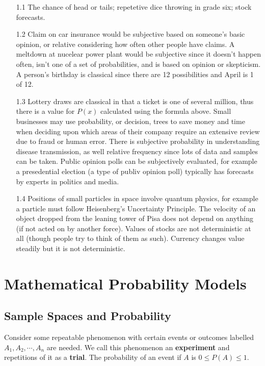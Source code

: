 \documentclass[english, 11pt]{article}
\begin{document}
  \begin{itemize}
    \item[1.1] The chance of head or tails; repetetive dice throwing in grade six; stock forecasts.
    \item[1.2] Claim on car insurance would be subjective based on someone's basic opinion, or relative considering how often other people have claims. A meltdown at nucelear power plant would be subjective since it doesn't happen often, isn't one of a set of probabilities, and is based on opinion or skepticism. A person's birthday is classical since there are 12 possibilities and April is 1 of 12.
    \item[1.3] Lottery draws are classical in that a ticket is one of several million, thus there is a value for $P(x)$ calculated using the formula above. Small businesses may use probability, or decision, trees to save money and time when deciding upon which areas of their company require an extensive review due to fraud or human error. There is subjective probability in understanding disease transmission, as well relative frequency since lots of data and samples can be taken. Public opinion polls can be subjectively evaluated, for example a presedential election (a type of publiv opinion poll) typically has forecasts by experts in politics and media.
    \item[1.4] Positions of small particles in space involve quantum physics, for example a particle must follow Heisenberg's Uncertainty Principle. The velocity of an object dropped from the leaning tower of Pisa does not depend on anything (if not acted on by another force). Values of stocks are not deterministic at all (though people try to think of them as such). Currency changes value steadily but it is not deterministic.
  \end{itemize}

  \section{Mathematical Probability Models}

  \subsection{Sample Spaces and Probability}

  Consider some repeatable phenomenon with certain events or outcomes labelled $A_1, A_2, \cdots, A_n$ are needed. We call this phenomenon an \textbf{experiment} and repetitions of it as a \textbf{trial}. The probability of an event if $A$ is $0 \leq P(A) \leq 1$.
\end{document}
